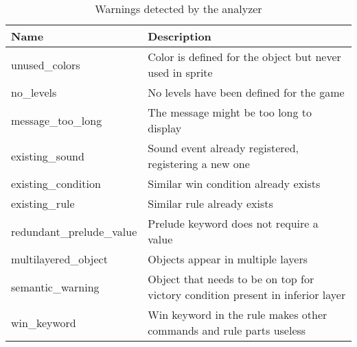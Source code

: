 \begin{table}[!htbp]
\centering
\caption{Warnings detected by the analyzer}
\label{tab:static_warnings}
\scriptsize
\begin{tabular}{ll}
\textbf{Name} & \textbf{Description}                                                                    \\ \hline
unused\_colors                                      & Color is defined for the object but never used in sprite                           \\
no\_levels                                          & No levels have been defined for the game                                       \\
message\_too\_long                                  & The message might be too long to display                                       \\
existing\_sound                                     & Sound event already registered, registering a new one                            \\
existing\_condition                                 & Similar win condition already exists                                           \\
existing\_rule                                      & Similar rule already exists                                                    \\
redundant\_prelude\_value                           & Prelude keyword does not require a value                                      \\
multilayered\_object                                & Objects appear in multiple layers                                              \\
semantic\_warning                                   & Object that needs to be on top for victory condition present in inferior layer \\
win\_keyword                                        & Win keyword in the rule makes other commands and rule parts useless                \\
\end{tabular}
\end{table}
